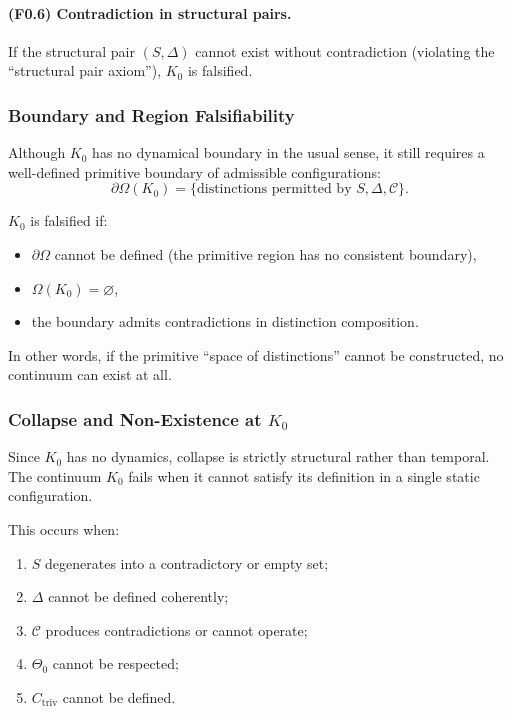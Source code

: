 \paragraph{(F0.6) Contradiction in structural pairs.}
If the structural pair $(S,\Delta)$ cannot exist without contradiction
(violating the ``structural pair axiom''), $K_0$ is falsified.



\subsubsection{Boundary and Region Falsifiability}

Although $K_0$ has no dynamical boundary in the usual sense,
it still requires a well-defined primitive boundary of admissible
configurations:
\[
\partial\Omega(K_0) = \{ \text{distinctions permitted by } S,\Delta,\mathcal{C} \}.
\]

$K_0$ is falsified if:

\begin{itemize}
    \item $\partial\Omega$ cannot be defined (the primitive region has no
          consistent boundary),
    \item $\Omega(K_0)=\varnothing$,
    \item the boundary admits contradictions in distinction composition.
\end{itemize}

In other words, if the primitive “space of distinctions” cannot be
constructed, no continuum can exist at all.



\subsubsection{Collapse and Non-Existence at \texorpdfstring{$K_0$}{K_0}}

Since $K_0$ has no dynamics, collapse is strictly structural rather than
temporal.
The continuum $K_0$ fails when it cannot satisfy its definition in a
single static configuration.

This occurs when:

\begin{enumerate}
    \item $S$ degenerates into a contradictory or empty set;
    \item $\Delta$ cannot be defined coherently;
    \item $\mathcal{C}$ produces contradictions or cannot operate;
    \item $\Theta_0$ cannot be respected;
    \item $C_{\mathrm{triv}}$ cannot be defined.
\end{enumerate}


